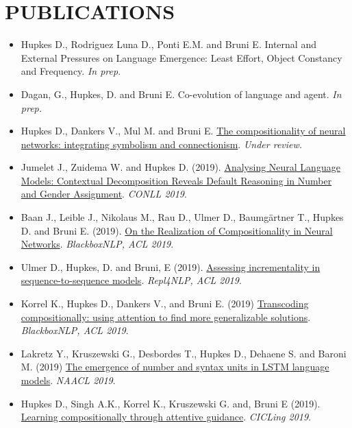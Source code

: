 \section{PUBLICATIONS}

\begin{itemize}
\setlength\itemsep{5pt}
    \item Hupkes D., Rodriguez Luna D., Ponti E.M. and Bruni E. Internal and External Pressures on Language Emergence:
Least Effort, Object Constancy and Frequency. \textit{In prep}.
    \item Dagan, G., Hupkes, D. and Bruni E. Co-evolution of language and agent. \textit{In prep.}
    \item Hupkes D., Dankers V., Mul M. and Bruni E. \href{https://arxiv.org/pdf/1908.08351.pdf}{The compositionality of neural networks: integrating symbolism and connectionism}. \textit{Under review.}
    
    \item Jumelet J., Zuidema W. and Hupkes D. (2019). \href{https://arxiv.org/pdf/1909.08975.pdf}{Analysing Neural Language Models: Contextual Decomposition Reveals Default Reasoning in Number and Gender Assignment}. \textit{CONLL 2019}.
    
    \item Baan J., Leible J., Nikolaus M., Rau D., Ulmer D., Baumgärtner T., Hupkes D. and Bruni E. (2019). \href{https://www.aclweb.org/anthology/W19-4814}{On the Realization of Compositionality in Neural Networks}. \textit{BlackboxNLP, ACL 2019}. 
    
    \item Ulmer D., Hupkes, D. and Bruni, E (2019). \href{https://www.aclweb.org/anthology/W19-4324}{Assessing incrementality in sequence-to-sequence models}. \textit{Repl4NLP, ACL 2019}. 
    
    \item Korrel K., Hupkes D., Dankers V., and Bruni E. (2019) \href{https://www.aclweb.org/anthology/W19-4801}{Transcoding compositionally: using attention to find more generalizable solutions}. \textit{BlackboxNLP, ACL 2019}.
    
    \item Lakretz Y., Kruszewski G., Desbordes T., Hupkes D., Dehaene S. and Baroni M. (2019) \href{https://www.aclweb.org/anthology/N19-1002}{The emergence of number and syntax units in LSTM language models}. \textit{NAACL 2019}.

    \item  Hupkes D., Singh A.K., Korrel K., Kruszewski G. and, Bruni E (2019). \href{https://arxiv.org/abs/1805.09657}{Learning compositionally through attentive guidance}. \textit{CICLing 2019}.
    

\end{itemize}
